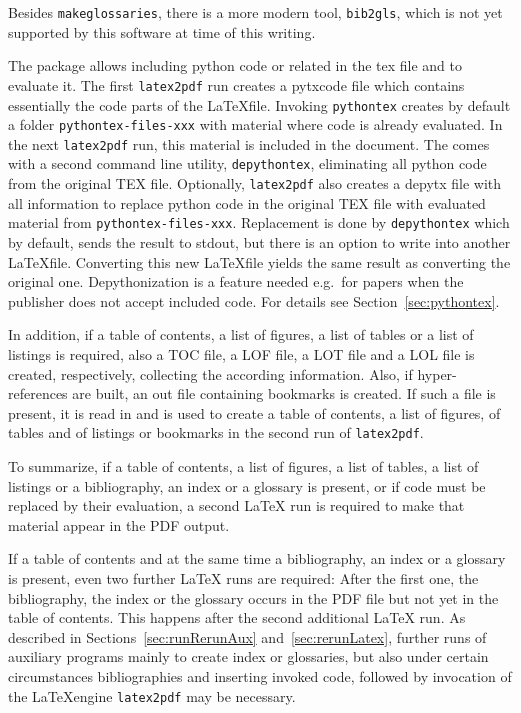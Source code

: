 Besides \texttt{makeglossaries}, there is a more modern tool, 
\texttt{bib2gls}, which is not yet supported by this software 
at time of this writing. 

The package  allows including python code or related 
in the \gls{tex} file and to evaluate it. 
The first \texttt{latex2pdf} run creates a \gls{pytxcode} file 
which contains essentially the code parts of the \LaTeX file. 
Invoking \texttt{pythontex} creates by default 
a folder \texttt{pythontex-files-xxx} 
with material where code is already evaluated. 
In the next \texttt{latex2pdf} run, this material is included in the document. 
The  comes with a second command line utility, 
\texttt{depythontex}, eliminating all python code from the original TEX file. 
Optionally, \texttt{latex2pdf} also creates a \gls{depytx} file 
with all information to replace python code in the original TEX file 
with evaluated material from \texttt{pythontex-files-xxx}. 
Replacement is done by \texttt{depythontex} 
which by default, sends the result to stdout, 
but there is an option to write into another \LaTeX file. 
Converting this new \LaTeX file 
yields the same result as converting the original one. 
Depythonization is a feature needed e.g.~for papers 
when the publisher does not accept included code. 
For details see Section~\ref{sec:pythontex}. 

In addition, if
a table of contents, a list of figures, a list of tables 
or a list of listings is required, 
also a TOC file, a LOF file, a LOT file and a LOL file is created,
respectively, 
collecting the according information. 
Also, if hyper-references are built, an \gls{out} file 
containing bookmarks is created. 
If such a file is present, it is read in and is used
to create a table of contents, a list of figures, of tables and of listings 
or bookmarks in the second run of \texttt{latex2pdf}. 

To summarize, 
if a table of contents, a list of figures, a list of tables, a list of listings or 
a bibliography, an index or a glossary is present, 
or if code must be replaced by their evaluation, 
a second \LaTeX{} run is required to make that material appear in the PDF output. 

If a table of contents and at the same time 
a bibliography, an index or a glossary is present, 
even two further \LaTeX{} runs are required: 
After the first one, the bibliography, the index or the glossary 
occurs in the PDF file but not yet in the table of contents. 
This happens after the second additional \LaTeX{} run. 
As described in Sections~\ref{sec:runRerunAux} and~\ref{sec:rerunLatex}, 
further runs of auxiliary programs mainly to create index or glossaries, 
but also under certain circumstances bibliographies and inserting invoked code, 
followed by invocation of the \LaTeX engine \texttt{latex2pdf} may be necessary. 

